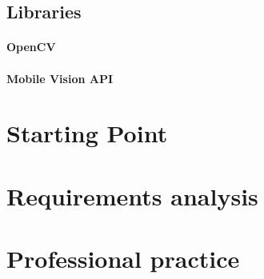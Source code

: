 \subsection{Libraries}
\paragraph{OpenCV}
\paragraph{Mobile Vision API}


\section{Starting Point}

\section{Requirements analysis}


\section{Professional practice}

